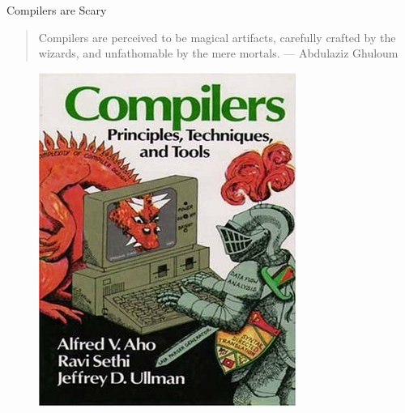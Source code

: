 \documentclass[presentation, bigger]{beamer}
\begin{document}
\begin{frame}[label={sec:org35ae571}]{Compilers are Scary}
\begin{quote}
Compilers are perceived to be magical artifacts, carefully crafted by
the wizards, and unfathomable by the mere mortals. --- Abdulaziz
Ghuloum
\end{quote}

\pause

\begin{figure}
  \centering
  \begin{minipage}[t]{0.22\textwidth}
    \includegraphics[width=\textwidth]{img/presentation/intro-dragon-book.jpg}
  \end{minipage}
  \hspace{5pt}
  \begin{minipage}[t]{0.2022\textwidth}

\end{minipage}
\end{figure}
\end{frame}
\end{document}
